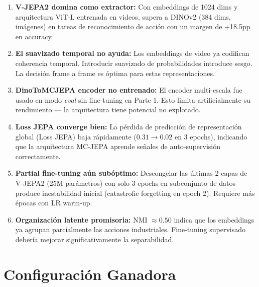 \documentclass[11pt,letterpaper]{article}
\begin{document}
\begin{enumerate}[leftmargin=1.5em]
  \item \textbf{V-JEPA2 domina como extractor:} Con embeddings de 1024 dims y arquitectura ViT-L entrenada en videos, supera a DINOv2 (384 dims, imágenes) en tareas de reconocimiento de acción con un margen de +18.5pp en accuracy.

  \item \textbf{El suavizado temporal no ayuda:} Los embeddings de video ya codifican coherencia temporal. Introducir suavizado de probabilidades introduce sesgo. La decisión frame a frame es óptima para estas representaciones.

  \item \textbf{DinoToMCJEPA encoder no entrenado:} El encoder multi-escala fue usado en modo \textit{eval} sin fine-tuning en Parte 1. Esto limita artificialmente su rendimiento — la arquitectura tiene potencial no explotado.

  \item \textbf{Loss JEPA converge bien:} La pérdida de predicción de representación global (Loss JEPA) baja rápidamente ($0.31 \to 0.02$ en 3 epochs), indicando que la arquitectura MC-JEPA aprende señales de auto-supervisión correctamente.

  \item \textbf{Partial fine-tuning aún subóptimo:} Descongelar las últimas 2 capas de V-JEPA2 (25M parámetros) con solo 3 epochs en subconjunto de datos produce inestabilidad inicial (catastrofic forgetting en epoch 2). Requiere más épocas con LR warm-up.

  \item \textbf{Organización latente promisoria:} NMI $\approx 0.50$ indica que los embeddings ya agrupan parcialmente las acciones industriales. Fine-tuning supervisado debería mejorar significativamente la separabilidad.
\end{enumerate}

\section{Configuración Ganadora}
\end{document}
